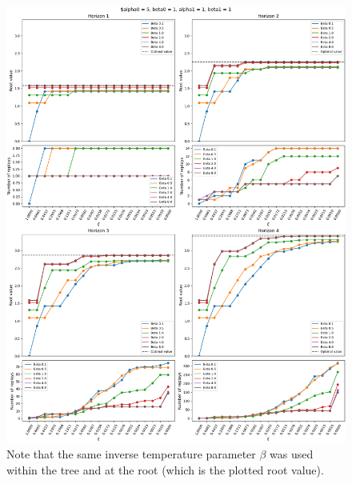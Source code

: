 \documentclass{article}
\begin{document}
\begin{figure}[ht!]
    \centering
    \includegraphics[width=1\textwidth]{../data/convergence/xi/alpha05_beta01_alpha11_beta11_complete.png}
    \caption{Note that the same inverse temperature parameter $\beta$ was used within the tree and at the 
    root (which is the plotted root value).}
\end{figure}
\end{document}
